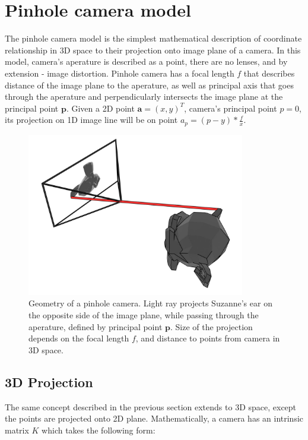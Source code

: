 \documentclass[11pt,english]{report}
\begin{document}
\section{Pinhole camera model}

The pinhole camera model is the simplest mathematical description of coordinate relationship in 3D space to their projection onto image plane of a camera. In this model, camera's aperature is described as a point, there are no lenses, and by extension - image distortion. Pinhole camera has a focal length $f$ that describes distance of the image plane to the aperature, as well as principal axis that goes through the aperature and perpendicularly intersects the image plane at the principal point $\mathbf{p}$. Given a 2D point $\mathbf{a} = (x, y)^T$, camera's principal point $p = 0$, its projection on 1D image line will be on point $a_p = (p - y) * \frac{f}{x}$.

\begin{figure}[!ht]
	\centering
	\includegraphics[width=270pt]{docs/report/pinhole-camera.jpg}
	\caption{\centering Geometry of a pinhole camera. Light ray projects Suzanne's ear on the opposite side of the image plane, while passing through the aperature, defined by principal point $\mathbf{p}$. Size of the projection depends on the focal length $f$, and distance to points from camera in 3D space.}
\end{figure}

\subsection{3D Projection}

The same concept described in the previous section extends to 3D space, except the points are projected onto 2D plane. Mathematically, a camera has an intrinsic matrix $K$ which takes the following form:
\end{document}

